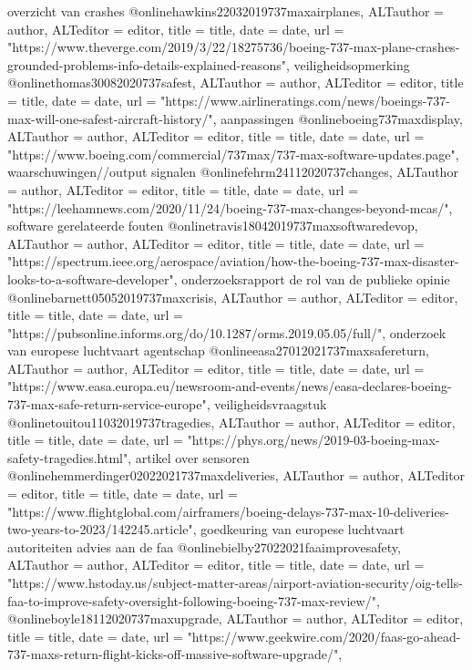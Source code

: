 {{{{{{{{{overzicht van crashes
@online{hawkins22032019737maxairplanes,	ALTauthor = {author},	ALTeditor = {editor},	title = {title},	date = {date},	url = {"https://www.theverge.com/2019/3/22/18275736/boeing-737-max-plane-crashes-grounded-problems-info-details-explained-reasons"},}
veiligheidsopmerking
@online{thomas30082020737safest,	ALTauthor = {author},	ALTeditor = {editor},	title = {title},	date = {date},	url = {"https://www.airlineratings.com/news/boeings-737-max-will-one-safest-aircraft-history/"},}
aanpassingen
@online{boeing737maxdisplay,	ALTauthor = {author},	ALTeditor = {editor},	title = {title},	date = {date},	url = {"https://www.boeing.com/commercial/737max/737-max-software-updates.page"},}
waarschuwingen//output signalen
@online{fehrm24112020737changes,	ALTauthor = {author},	ALTeditor = {editor},	title = {title},	date = {date},	url = {"https://leehamnews.com/2020/11/24/boeing-737-max-changes-beyond-mcas/"},}
software gerelateerde fouten
@online{travis18042019737maxsoftwaredevop,	ALTauthor = {author},	ALTeditor = {editor},	title = {title},	date = {date},	url = {"https://spectrum.ieee.org/aerospace/aviation/how-the-boeing-737-max-disaster-looks-to-a-software-developer"},}
onderzoeksrapport
de rol van de publieke opinie
@online{barnett05052019737maxcrisis,	ALTauthor = {author},	ALTeditor = {editor},	title = {title},	date = {date},	url = {"https://pubsonline.informs.org/do/10.1287/orms.2019.05.05/full/"},}
onderzoek van europese luchtvaart agentschap
@online{easa27012021737maxsafereturn,	ALTauthor = {author},	ALTeditor = {editor},	title = {title},	date = {date},	url = {"https://www.easa.europa.eu/newsroom-and-events/news/easa-declares-boeing-737-max-safe-return-service-europe"},}
veiligheidsvraagstuk
@online{touitou11032019737tragedies,	ALTauthor = {author},	ALTeditor = {editor},	title = {title},	date = {date},	url = {"https://phys.org/news/2019-03-boeing-max-safety-tragedies.html"},}
artikel over sensoren
@online{hemmerdinger02022021737maxdeliveries,	ALTauthor = {author},	ALTeditor = {editor},	title = {title},	date = {date},	url = {"https://www.flightglobal.com/airframers/boeing-delays-737-max-10-deliveries-two-years-to-2023/142245.article"},}
goedkeuring van europese luchtvaart autoriteiten
advies aan de faa
@online{bielby27022021faaimprovesafety,	ALTauthor = {author},	ALTeditor = {editor},	title = {title},	date = {date},	url = {"https://www.hstoday.us/subject-matter-areas/airport-aviation-security/oig-tells-faa-to-improve-safety-oversight-following-boeing-737-max-review/"},}
@online{boyle18112020737maxupgrade,	ALTauthor = {author},	ALTeditor = {editor},	title = {title},	date = {date},	url = {"https://www.geekwire.com/2020/faas-go-ahead-737-maxs-return-flight-kicks-off-massive-software-upgrade/"},}
}}}}}}}}}
